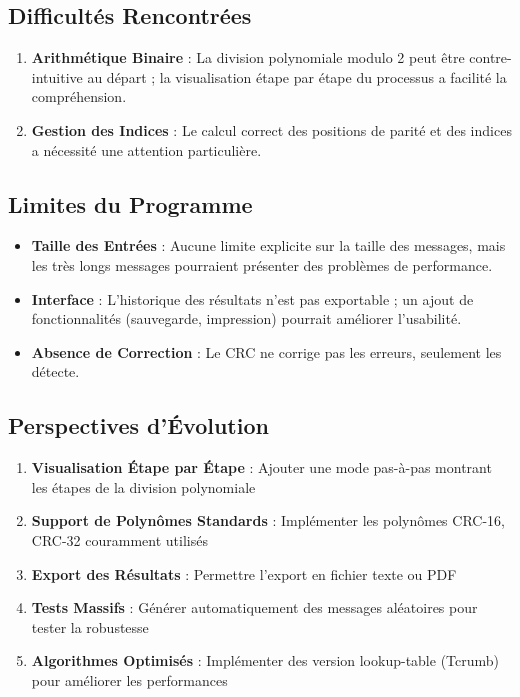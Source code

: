 \documentclass[12pt, a4paper]{article}
\begin{document}
\subsection{Difficultés Rencontrées}

\begin{enumerate}
    \item \textbf{Arithmétique Binaire} : La division polynomiale modulo 2 peut être contre-intuitive au départ ; la visualisation étape par étape du processus a facilité la compréhension.
    \item \textbf{Gestion des Indices} : Le calcul correct des positions de parité et des indices a nécessité une attention particulière.
\end{enumerate}

\subsection{Limites du Programme}

\begin{itemize}
    \item \textbf{Taille des Entrées} : Aucune limite explicite sur la taille des messages, mais les très longs messages pourraient présenter des problèmes de performance.
    \item \textbf{Interface} : L'historique des résultats n'est pas exportable ; un ajout de fonctionnalités (sauvegarde, impression) pourrait améliorer l'usabilité.
    \item \textbf{Absence de Correction} : Le CRC ne corrige pas les erreurs, seulement les détecte.
\end{itemize}

\subsection{Perspectives d'Évolution}

\begin{enumerate}
    \item \textbf{Visualisation Étape par Étape} : Ajouter une mode pas-à-pas montrant les étapes de la division polynomiale
    \item \textbf{Support de Polynômes Standards} : Implémenter les polynômes CRC-16, CRC-32 couramment utilisés
    \item \textbf{Export des Résultats} : Permettre l'export en fichier texte ou PDF
    \item \textbf{Tests Massifs} : Générer automatiquement des messages aléatoires pour tester la robustesse
    \item \textbf{Algorithmes Optimisés} : Implémenter des version lookup-table (Tcrumb) pour améliorer les performances
\end{enumerate}
\end{document}
